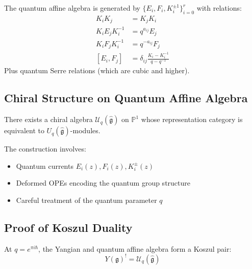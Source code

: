 \begin{definition}
The quantum affine algebra is generated by $\{E_i, F_i, K_i^{\pm 1}\}_{i=0}^r$ with relations:
\begin{align}
K_iK_j &= K_jK_i \\
K_iE_jK_i^{-1} &= q^{a_{ij}}E_j \\
K_iF_jK_i^{-1} &= q^{-a_{ij}}F_j \\
[E_i, F_j] &= \delta_{ij}\frac{K_i - K_i^{-1}}{q - q^{-1}}
\end{align}
Plus quantum Serre relations (which are cubic and higher).
\end{definition}

\subsection{Chiral Structure on Quantum Affine Algebra}

\begin{theorem}
There exists a chiral algebra $\mathcal{U}_q(\hat{\mathfrak{g}})$ on $\mathbb{P}^1$ whose representation category is equivalent to $U_q(\hat{\mathfrak{g}})$-modules.
\end{theorem}

The construction involves:
\begin{itemize}
\item Quantum currents $E_i(z), F_i(z), K_i^{\pm}(z)$
\item Deformed OPEs encoding the quantum group structure
\item Careful treatment of the quantum parameter $q$
\end{itemize}

\subsection{Proof of Koszul Duality}

\begin{theorem}
\label{thm:yangian-quantum-affine}
At $q = e^{\pi i \hbar}$, the Yangian and quantum affine algebra form a Koszul pair:
\[
Y(\mathfrak{g})^! = \mathcal{U}_q(\hat{\mathfrak{g}})
\]
\end{theorem}

